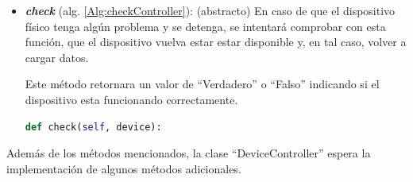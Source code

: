\begin{itemize}
            \item \textbf{\textit{check}} (alg. \ref{Alg:checkController}): 
            (abstracto) En caso de que el dispositivo físico tenga algún problema y se detenga, se intentará comprobar con esta función, que el dispositivo vuelva estar estar disponible y, en tal caso, volver a cargar datos.
            
            Este método retornara un valor de ``Verdadero'' o ``Falso'' indicando si el dispositivo esta funcionando correctamente.
            
            \begin{lstlisting}[language=Python, caption={Firma del método ``\textit{check}''.}, label=Alg:checkController, numbers=none]
def check(self, device):
            \end{lstlisting}
        
        \end{itemize}
        
        Además de los métodos mencionados, la clase ``DeviceController'' espera la implementación de algunos métodos adicionales.
        
